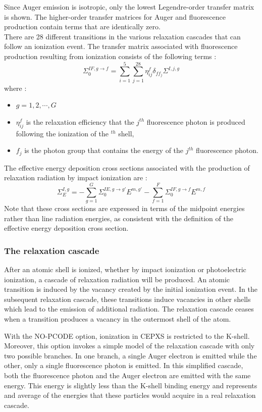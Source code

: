 Since Auger emission is isotropic, only the lowest Legendre-order transfer
matrix is shown. The higher-order transfer matrices for Auger and fluorescence
production contain terms that are identically zero.\\
There are 28 different transitions in the various relaxation cascades that can
follow an ionization event. The transfer matrix associated with fluorescence
production resulting from ionization consists of the following terms :
\begin{equation}
\Sigma_{0}^{IF,g\rightarrow f} = \sum_{i=1}^5 \sum_{j=1}^{28} \eta_{ij}^f
\delta_{ff_j} \Sigma^{I,j,g}
\end{equation}
where :
\begin{itemize}
\item $g=1,2,\cdots,G$
\item $\eta_{ij}^f$ is the relaxation efficiency that the $j^{th}$ fluorescence
photon is produced following the ionization of the $^{th}$ shell,
\item $f_j$ is the photon group that contains the energy of the $j^{th}$
fluorescence photon.
\end{itemize}
The effective energy deposition cross sections associated with the production
of relaxation radiation by impact ionization are :
\begin{equation}
\Sigma_E^{I,g} = - \sum_{g=1}^G \Sigma_0^{IE,g\rightarrow g'}E^{m,g'}
- \sum_{f=1}^F \Sigma_0^{IF,g\rightarrow f} E^{m,f}
\end{equation}
Note that these cross sections are expressed in terms of the midpoint energies
rather than line radiation energies, as consistent with the definition of the
effective energy deposition cross section.

\subsubsection{The relaxation cascade}
After an atomic shell is ionized, whether by impact ionization or
photoelectric ionization, a cascade of relaxation radiation will be produced.
An atomic transition is induced by the vacancy created by the initial
ionization event. In the subsequent relaxation cascade, these transitions
induce vacancies in other shells which lead to the emission of additional 
radiation. The relaxation cascade ceases when a transition produces a vacancy
in the outermost shell of the atom.

With the NO-PCODE option, ionization in CEPXS is restricted to the K-shell.
Moreover, this option invokes a simple model of the relaxation cascade with
only two possible branches. In one branch, a single Auger electron is emitted
while the other, only a single fluorescence photon is emitted. In this
simplified cascade, both the fluorescence photon and the Auger electron are
emitted with the same energy. This energy is slightly less than the
K-shell binding energy and represents and average of the energies that these
particles would acquire in a real relaxation cascade.

